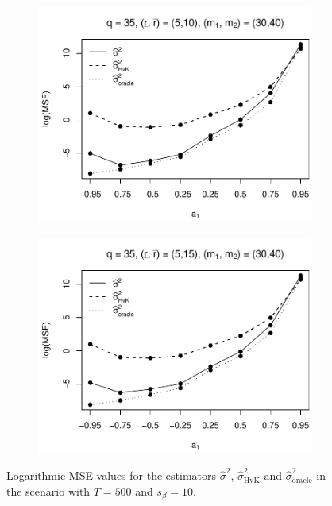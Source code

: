 \begin{figure}[p]
\begin{subfigure}[b]{0.45\textwidth}
\includegraphics[width=\textwidth]{Plots/Plots_Supplement/MSE_lrv_T=500_slope=10_(L1,L2,K1,K2,M1,M2)=(35,35,5,10,30,40).pdf}
\end{subfigure}
\hspace{0.25cm}
\begin{subfigure}[b]{0.45\textwidth}
\includegraphics[width=\textwidth]{Plots/Plots_Supplement/MSE_lrv_T=500_slope=10_(L1,L2,K1,K2,M1,M2)=(35,35,5,15,30,40).pdf}
\end{subfigure}
\caption{Logarithmic MSE values for the estimators $\widehat{\sigma}^2$, $\widehat{\sigma}^2_{\text{HvK}}$ and $\widehat{\sigma}^2_{\text{oracle}}$ in the scenario with $T=500$ and $s_\beta=10$.}\label{fig:MSE_slope10_lrv_robust} 
\end{figure}


